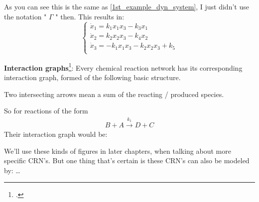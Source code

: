 As you can see this is the same as \ref{1st_example_dyn_system}, I just didn't use the notation " $\Gamma$ " then. This results in:
\[
	\begin{cases*}
		\dot{x}_1 = k_1 x_1 x_3 - k_3x_1  \\
		\dot{x}_2 = k_2 x_2 x_3 - k_4 x_2  \\
		\dot{x}_3 = -k_1 x_1 x_3 - k_2 x_2 x_3 + k_5 \\
	\end{cases*}
\]

\textbf{Interaction graphs}\footcite{Derbez2015}: Every chemical reaction network has its corresponding interaction graph, formed of the following basic structure.

Two intersecting arrows mean a sum of the reacting / produced species.

So for reactions of the form
\begin{align*}
	B + A \xrightarrow{k_{1}} D + C
\end{align*}
Their interaction graph would be:

We'll use these kinds of figures in later chapters, when talking about more specific CRN's.
But one thing that's certain is these CRN's can also be modeled by: \ldots